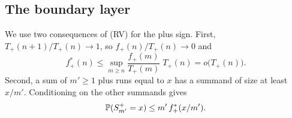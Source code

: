 \subsection{The boundary layer}\label{sec:boundary-proof}

We use two consequences of (RV) for the plus sign. First,
$T_\plus(n+1)/T_\plus(n)\to1$, so $f_\plus(n)/T_\plus(n)\to0$ and
\begin{equation}\label{eq:fstar-small}
 f^*_\plus(n)\le\sup_{m\ge n}\frac{f_\plus(m)}{T_\plus(m)}\;T_\plus(n)=o\bigl(T_\plus(n)\bigr).
\end{equation}
Second, a sum of $m'\ge1$ plus runs equal to $x$ has a summand of size at least
$x/m'$. Conditioning on the other summands gives
\begin{equation}\label{eq:one-summand}
 \mathbb{P}(S^{+}_{m'}=x)\le m'\,f^*_{+}(x/m').
\end{equation}

